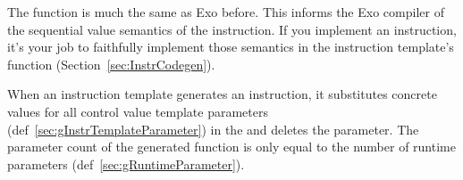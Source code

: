 
The  function is much the same as Exo before.
This informs the Exo compiler of the sequential value semantics of the instruction.
If you implement an instruction, it's your job to faithfully implement those semantics in the instruction template's  function (Section~\ref{sec:InstrCodegen}).

When an instruction template generates an instruction, it substitutes concrete values for all control value template parameters (def~\ref{sec:gInstrTemplateParameter}) in the  and deletes the parameter.
The parameter count of the generated function is only equal to the number of runtime parameters (def~\ref{sec:gRuntimeParameter}).


